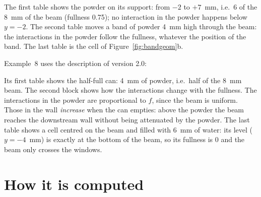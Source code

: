 
The first table shows the powder on its support: from $-2$ to $+7$~mm, i.e.\ 6 of the 8~mm of the beam (fullness 0.75);
no interaction in the powder happens below $y=-2$. The second table moves a band of powder 4~mm high through the beam: the
interactions in the powder follow the fullness, whatever the position of the band. The last table is the cell of
Figure~\ref{fig:bandgeom}b.

Example~8 uses the description of version 2.0:


Its first table shows the half-full can: 4~mm of powder, i.e.\ half of the 8~mm beam. The second block shows how the
interactions change with the fullness. The interactions in the powder are proportional to $f$, since the beam is uniform.
Those in the wall \emph{increase} when the can empties: above the powder the beam reaches the downstream wall without
being attenuated by the powder. The last table shows a cell centred on the beam and filled with 6~mm of water: its level
($y=-4$~mm) is exactly at the bottom of the beam, so its fullness is 0 and the beam only crosses the windows.

\section{How it is computed}
\label{sec:partial-algorithm}

